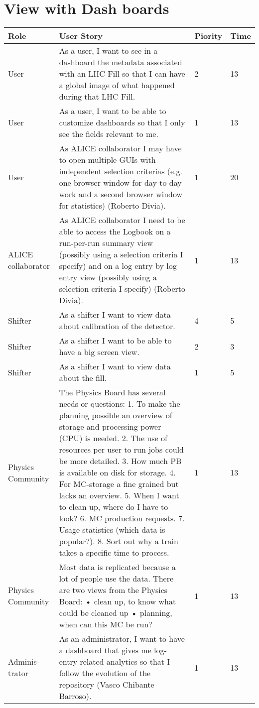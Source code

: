\section{View with Dash boards}
\begin{longtable}{ | p{2cm} | p{8cm} | p{1.5cm} | l |}
\hline
Role & User Story & Piority & Time \\ \hline
User &  As a user, I want to see in a dashboard the metadata associated with
an LHC Fill so that I can have a global image of what happened during that LHC Fill. & 2 & 13 \\ \hline
User &  As a user, I want to be able to customize dashboards so that I only see the fields relevant to me. & 1 & 13 \\ \hline
User &  As ALICE collaborator I may have to open multiple GUIs with independent selection criterias (e.g. one browser window for day-to-day work and a second browser window for statistics) (Roberto Divia). & 1 & 20 \\ \hline
ALICE collaborator &  As ALICE collaborator I need to be able to access the Logbook on a run-per-run summary view (possibly using a selection criteria I specify) and on a log entry by log entry view (possibly using a selection criteria
I specify) (Roberto Divia). & 1 & 13 \\ \hline
Shifter & As a shifter I want to view data about calibration of the detector. & 4 & 5 \\ \hline
Shifter & As a shifter I want to be able to have a big screen view. & 2 & 3 \\ \hline
Shifter & As a shifter I want to view data about the fill. & 1 & 5\\ \hline
Physics Community & The Physics Board has several needs or questions:
1. To make the planning possible an overview of storage and processing
power (CPU) is needed.
2. The use of resources per user to run jobs could be more detailed.
3. How much PB is available on disk for storage.
4. For MC-storage a fine grained but lacks an overview.
5. When I want to clean up, where do I have to look?
6. MC production requests.
7. Usage statistics (which data is popular?).
8. Sort out why a train takes a specific time to process. & 1 & 13\\ \hline
Physics Community & Most data is replicated because a lot of people use the data.
There are two views from the Physics Board:
• clean up, to know what could be cleaned up
• planning, when can this MC be run?
& 1 & 13 \\ \hline
Adminis-trator & As an administrator, I want to have a dashboard that gives me log-
entry related analytics so that I follow the evolution of the repository
(Vasco Chibante Barroso). & 1 & 13 \\ \hline

\end{longtable}

